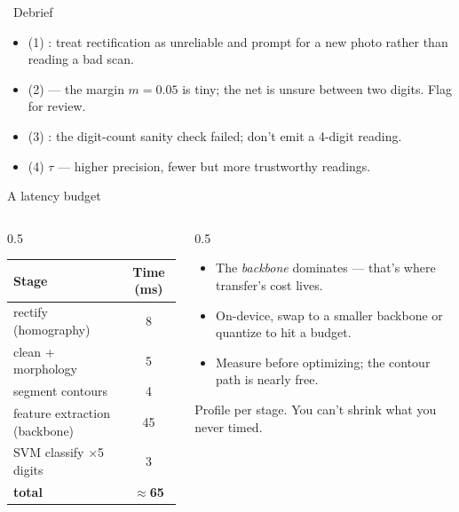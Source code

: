 \documentclass[10pt,aspectratio=169]{beamer}
\begin{document}
\begin{frame}{\faPen~Debrief}
  \begin{itemize}
    \item (1) : treat rectification as unreliable and prompt for a new photo rather than reading a bad scan.
    \item (2)  — the margin $m=0.05$ is tiny; the net is unsure between two digits. Flag for review.
    \item (3) : the digit-count sanity check failed; don't emit a 4-digit reading.
    \item (4)  $\tau$ — higher precision, fewer but more trustworthy readings.
  \end{itemize}
\end{frame}

\begin{frame}{A latency budget}
  \begin{columns}[T]
    \begin{column}{0.5\textwidth}
      \begin{tabular}{@{}lc@{}}
        \toprule
        \textbf{Stage} & \textbf{Time (ms)} \\
        \midrule
        rectify (homography) & 8 \\
        clean + morphology & 5 \\
        segment contours & 4 \\
        feature extraction (backbone) & 45 \\
        SVM classify $\times$5 digits & 3 \\
        \midrule
        \textbf{total} & \textbf{$\approx$65} \\
        \bottomrule
      \end{tabular}
    \end{column}
    \begin{column}{0.5\textwidth}
      \begin{itemize}
        \item The \emph{backbone} dominates — that's where transfer's cost lives.
        \item On-device, swap to a smaller backbone or quantize to hit a budget.
        \item Measure before optimizing; the contour path is nearly free.
      \end{itemize}
      \begin{goodbox}
        Profile per stage. You can't shrink what you never timed.
      \end{goodbox}
    \end{column}
  \end{columns}
\end{frame}
\end{document}
